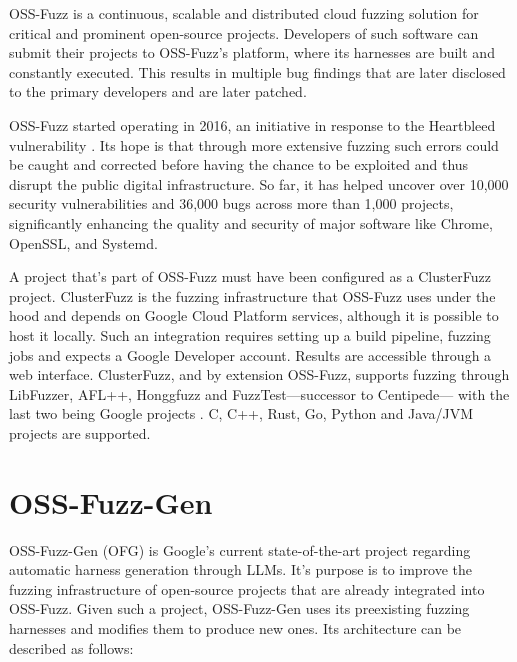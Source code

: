 \documentclass[
  a4paper,
]{scrreprt}
\theoremstyle{definition}
\theoremstyle{remark}
\begin{document}
OSS-Fuzz \autocite{ossfuzzdocs2025,oss-fuzz} is a continuous, scalable
and distributed cloud fuzzing solution for critical and prominent
open-source projects. Developers of such software can submit their
projects to OSS-Fuzz's platform, where its harnesses are built and
constantly executed. This results in multiple bug findings that are
later disclosed to the primary developers and are later patched.

OSS-Fuzz started operating in 2016, an initiative in response to the
Heartbleed vulnerability
\autocite{heartbleed-cve,wheeler2014,heartbleed}. Its hope is that
through more extensive fuzzing such errors could be caught and corrected
before having the chance to be exploited and thus disrupt the public
digital infrastructure. So far, it has helped uncover over 10,000
security vulnerabilities and 36,000 bugs across more than 1,000
projects, significantly enhancing the quality and security of major
software like Chrome, OpenSSL, and Systemd.

A project that's part of OSS-Fuzz must have been configured as a
ClusterFuzz \autocite{clusterfuzz} project. ClusterFuzz is the fuzzing
infrastructure that OSS-Fuzz uses under the hood and depends on Google
Cloud Platform services, although it is possible to host it locally.
Such an integration requires setting up a build pipeline, fuzzing jobs
and expects a Google Developer account. Results are accessible through a
web interface. ClusterFuzz, and by extension OSS-Fuzz, supports fuzzing
through LibFuzzer, AFL++, Honggfuzz and FuzzTest---successor to
Centipede--- with the last two being Google projects
\autocite{libfuzzer,fuzztest,honggfuzz,aflpp}. C, C++, Rust, Go, Python
and Java/JVM projects are supported.

\section{OSS-Fuzz-Gen}\label{sec-ofg}

OSS-Fuzz-Gen (OFG) \autocite{liu2023,oss-fuzz-gen} is Google's current
state-of-the-art project regarding automatic harness generation through
LLMs. It's purpose is to improve the fuzzing infrastructure of
open-source projects that are already integrated into OSS-Fuzz. Given
such a project, OSS-Fuzz-Gen uses its preexisting fuzzing harnesses and
modifies them to produce new ones. Its architecture can be described as
follows:
\end{document}
